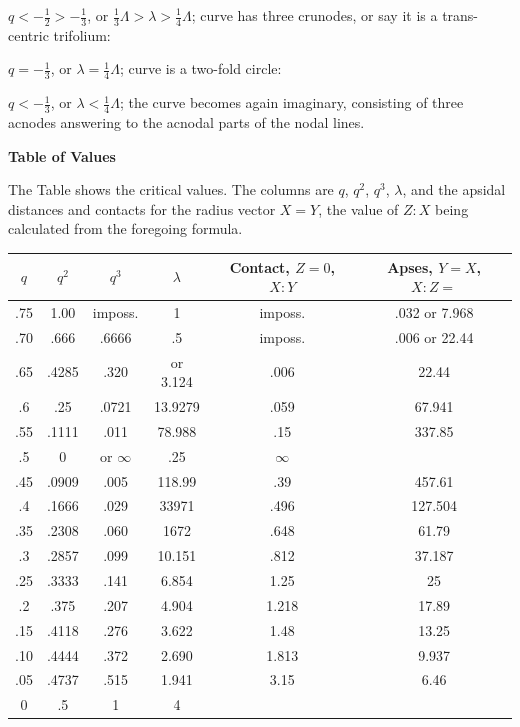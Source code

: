 \documentclass[11pt,a4paper]{book}
\begin{document}
\smallskip

$q < -\tfrac{1}{2} > -\tfrac{1}{3}$, or $\tfrac{1}{3}\Lambda > \lambda > \tfrac{1}{4}\Lambda$; curve has three crunodes, or say it is a trans-centric trifolium:

\smallskip

$q = -\tfrac{1}{3}$, or $\lambda = \tfrac{1}{4}\Lambda$; curve is a two-fold circle:

\smallskip

$q < -\tfrac{1}{3}$, or $\lambda < \tfrac{1}{4}\Lambda$; the curve becomes again imaginary, consisting of three acnodes answering to the acnodal parts of the nodal lines.

\vspace{12pt}

\begin{center}
\textbf{Table of Values}
\end{center}

The Table shows the critical values. The columns are $q$, $q^2$, $q^3$, $\lambda$, and the apsidal distances and contacts for the radius vector $X = Y$, the value of $Z : X$ being calculated from the foregoing formula.

\begin{center}
\begin{tabular}{c c c c c c}
\toprule
$q$ & $q^2$ & $q^3$ & $\lambda$ & Contact, $Z=0$, $X:Y$ & Apses, $Y=X$, $X:Z=$ \\
\midrule
.75 & 1.00 & imposs. & 1 & imposs. & .032 or 7.968 \\
.70 & .666 & .6666 & .5 & imposs. & .006 or 22.44 \\
.65 & .4285 & .320 & or 3.124 & .006 & 22.44 \\
.6 & .25 & .0721 & 13.9279 & .059 & 67.941 \\
.55 & .1111 & .011 & 78.988 & .15 & 337.85 \\
.5 & 0 & or $\infty$ & .25 & $\infty$ \\
.45 & .0909 & .005 & 118.99 & .39 & 457.61 \\
.4 & .1666 & .029 & 33971 & .496 & 127.504 \\
.35 & .2308 & .060 & 1672 & .648 & 61.79 \\
.3 & .2857 & .099 & 10.151 & .812 & 37.187 \\
.25 & .3333 & .141 & 6.854 & 1.25 & 25 \\
.2 & .375 & .207 & 4.904 & 1.218 & 17.89 \\
.15 & .4118 & .276 & 3.622 & 1.48 & 13.25 \\
.10 & .4444 & .372 & 2.690 & 1.813 & 9.937 \\
.05 & .4737 & .515 & 1.941 & 3.15 & 6.46 \\
0 & .5 & 1 & 4 & \\
\bottomrule
\end{tabular}
\end{center}
\end{document}
